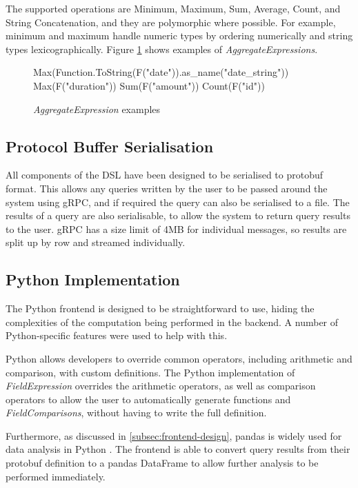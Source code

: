 The supported operations are Minimum, Maximum, Sum, Average, Count, and String Concatenation, and they are polymorphic where possible. For example, minimum and maximum handle numeric types by ordering numerically and string types lexicographically. Figure \ref{fig:aggregate-expressions-examples} shows examples of \textit{AggregateExpressions}.

\begin{figure}[htp]
	\begin{python}
Max(Function.ToString(F("date")).as_name("date_string"))
Max(F("duration"))
Sum(F("amount"))
Count(F("id"))
	\end{python}
	\caption{\textit{AggregateExpression} examples}
	\label{fig:aggregate-expressions-examples}
\end{figure}

\subsection{Protocol Buffer Serialisation}
All components of the DSL have been designed to be serialised to protobuf format. This allows any queries written by the user to be passed around the system using gRPC, and if required the query can also be serialised to a file. The results of a query are also serialisable, to allow the system to return query results to the user. gRPC has a size limit of 4MB for individual messages, so results are split up by row and streamed individually.

\subsection{Python Implementation}\label{subsec:dsl-python}
The Python frontend is designed to be straightforward to use, hiding the complexities of the computation being performed in the backend. A number of Python-specific features were used to help with this.

Python allows developers to override common operators, including arithmetic and comparison, with custom definitions. The Python implementation of \textit{FieldExpression} overrides the arithmetic operators, as well as comparison operators to allow the user to automatically generate functions and \textit{FieldComparisons}, without having to write the full definition.

Furthermore, as discussed in \ref{subsec:frontend-design}, pandas is widely used for data analysis in Python \cite{reback2020pandas}. The frontend is able to convert query results from their protobuf definition to a pandas DataFrame to allow further analysis to be performed immediately.



